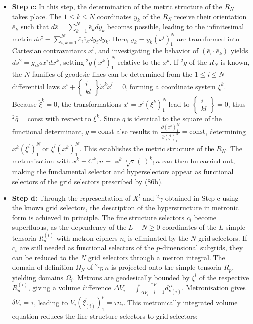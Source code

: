 \documentclass[12pt]{article}
\begin{document}
\begin{itemize}
\begin{itemize}
        \item \textbf{Step c:} In this step, the determination of the metric structure of the \( R_N \) takes place. The \( 1 \le k \le N \) coordinates \( y_k \) of the \( R_N \) receive their orientation \( \bar{e}_k \) such that \( d\bar{s} = \sum_{k=1}^N \bar{e}_k dy_k \) becomes possible, leading to the infinitesimal metric \( ds^2 = \sum_{i,k=1}^N \bar{e}_i \bar{e}_k dy_i dy_k \). Here, \( y_k = y_k(x^l)_1^N \) are transformed into Cartesian contravariants \( x^l \), and investigating the behavior of \( (\bar{e}_i \cdot \bar{e}_k) \) yields \( ds^2 = g_{ik} dx^i dx^k \), setting \( {}^2\bar{g}(x^k)_1^N \) relative to the \( x^k \). If \( {}^2\bar{g} \) of the \( R_N \) is known, the \( N \) families of geodesic lines can be determined from the \( 1 \le i \le N \) differential laws \( \ddot{x}^i + \left\{\begin{matrix} i \\ k l \end{matrix}\right\} \dot{x}^k \dot{x}^l = 0 \), forming a coordinate system \( \xi^k \). Because \(\ddot{\xi}^k = 0\), the transformations \( x^l = x^l(\xi^k)_1^N \) lead to \( \left\{\begin{matrix} i \\ k l \end{matrix}\right\} = 0 \), thus \({}^2\bar{g} = \text{const}\) with respect to \( \xi^k \). Since \( g \) is identical to the square of the functional determinant, \( g = \text{const} \) also results in \( \frac{\partial(x^k)_1^N}{\partial(\xi^l)_1^N} = \text{const} \), determining \( x^k(\xi^l)_1^N \) or \( \xi^l(x^k)_1^N \). This establishes the metric structure of the \( R_N \). The metronization with \( x^k = C^k ; n = \varkappa^k \sqrt[p]{\tau} (\ )^k ; n \) can then be carried out, making the fundamental selector and hyperselectors appear as functional selectors of the grid selectors prescribed by (86b).
        \item \textbf{Step d:} Through the representation of \( X^l \) and \( {}^2\bar{\gamma} \) obtained in Step c using the known grid selectors, the description of the hyperstructure in metronic form is achieved in principle. The fine structure selectors \( c_i \) become superfluous, as the dependency of the \( L - N \ge 0 \) coordinates of the \( L \) simple tensoria \( R_p^{(i)} \) with metron ciphers \( n_i \) is eliminated by the \( N \) grid selectors. If \( c_i \) are still needed as functional selectors of the \( p \)-dimensional subgrids, they can be reduced to the \( N \) grid selectors through a metron integral. The domain of definition \(\Omega_N\) of \({}^2\bar{\gamma} ; n\) is projected onto the simple tensoria \(R_p\), yielding domains \(\Omega_i\). Metrons are geodesically bounded by \(\xi^l\) of the respective \(R_p^{(i)}\), giving a volume difference \(\Delta V_i = \int_{\Delta V_i} \overline{||}_{l=1}^p d\xi_{(i)}^l\). Metronization gives \(\delta V_i = \tau\), leading to \(V_i(\xi_{(i)}^l)_1^p = \tau n_i\). This metronically integrated volume equation reduces the fine structure selectors to grid selectors:

\end{itemize}
\end{itemize}
\end{document}
